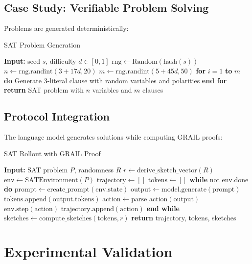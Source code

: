 \documentclass[11pt,a4paper]{article}
\begin{document}
\subsection{Case Study: Verifiable Problem Solving}

Problems are generated deterministically:
\begin{algorithm}
\caption{SAT Problem Generation}
\begin{algorithmic}
\STATE \textbf{Input:} seed $s$, difficulty $d \in [0,1]$
\STATE $\text{rng} \leftarrow \text{Random}(\text{hash}(s))$
\STATE $n \leftarrow \text{rng.randint}(3 + 17d, 20)$ 
\STATE $m \leftarrow \text{rng.randint}(5 + 45d, 50)$ 
\STATE \textbf{for} $i = 1$ \textbf{to} $m$ \textbf{do}
\STATE \quad Generate 3-literal clause with random variables and polarities
\STATE \textbf{end for}
\STATE \textbf{return} SAT problem with $n$ variables and $m$ clauses
\end{algorithmic}
\end{algorithm}

\subsection{Protocol Integration}

The language model generates solutions while computing GRAIL proofs:

\begin{algorithm}
\caption{SAT Rollout with GRAIL Proof}
\begin{algorithmic}
\STATE \textbf{Input:} SAT problem $P$, randomness $R$
\STATE $r \leftarrow \text{derive\_sketch\_vector}(R)$
\STATE $\text{env} \leftarrow \text{SATEnvironment}(P)$
\STATE $\text{trajectory} \leftarrow []$
\STATE $\text{tokens} \leftarrow []$
\STATE \textbf{while} not env.done \textbf{do}
\STATE \quad $\text{prompt} \leftarrow \text{create\_prompt}(\text{env.state})$
\STATE \quad $\text{output} \leftarrow \text{model.generate}(\text{prompt})$
\STATE \quad $\text{tokens.append}(\text{output.tokens})$
\STATE \quad $\text{action} \leftarrow \text{parse\_action}(\text{output})$
\STATE \quad $\text{env.step}(\text{action})$
\STATE \quad $\text{trajectory.append}(\text{action})$
\STATE \textbf{end while}
\STATE $\text{sketches} \leftarrow \text{compute\_sketches}(\text{tokens}, r)$
\STATE \textbf{return} trajectory, tokens, sketches
\end{algorithmic}
\end{algorithm}

\section{Experimental Validation}
\end{document}
